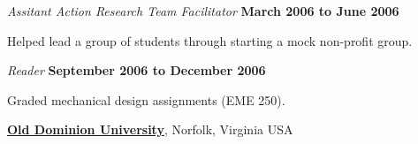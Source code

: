 \documentclass[10pt]{article}
\newenvironment{outerlist}[1][\enskip\textbullet]%
        {\begin{itemize}[#1]}{\end{itemize}%
         \vspace{-.6\baselineskip}}
\newenvironment{innerlist}[1][\enskip\textbullet]%
        {\begin{compactitem}[#1]}{\end{compactitem}}
\newcommand{\blankline}{\quad\pagebreak[2]}
\begin{document}
\begin{outerlist}
\item[] \textit{Assitant Action Research Team Facilitator}%
        \hfill \textbf{March 2006 to June 2006}
\begin{innerlist}
\item Helped lead a group of students through starting a mock non-profit group.
\end{innerlist}

\item[] \textit{Reader}%
        \hfill \textbf{September 2006 to December 2006}
\begin{innerlist}
\item Graded mechanical design assignments (EME 250).
\end{innerlist}
\end{outerlist}
\blankline

\href{http://www.odu.edu}{\textbf{Old Dominion University}}, Norfolk, Virginia USA
\end{document}
